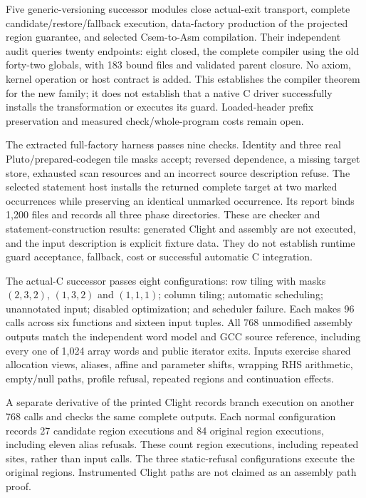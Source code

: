 Five generic-versioning successor modules close actual-exit transport,
complete candidate/restore/fallback execution, data-factory production of the
projected region guarantee, and selected Csem-to-Asm compilation. Their
independent audit queries twenty endpoints: eight closed, the complete compiler
using the old forty-two globals, with 183 bound files and validated parent
closure. No axiom, kernel operation or host contract is added. This establishes
the compiler theorem for the new family; it does not establish that a native
C driver successfully installs the transformation or executes its guard.
Loaded-header prefix preservation and measured check/whole-program costs
remain open.

The extracted full-factory harness passes nine checks. Identity and three real
Pluto/prepared-codegen tile masks accept; reversed dependence, a missing target
store, exhausted scan resources and an incorrect source description refuse.
The selected statement host installs the returned complete target at two marked
occurrences while preserving an identical unmarked occurrence. Its report binds
1,200 files and records all three phase directories. These are checker and
statement-construction results: generated Clight and assembly are not executed,
and the input description is explicit fixture data. They do not establish
runtime guard acceptance, fallback, cost or successful automatic C integration.

The actual-C successor passes eight configurations: row tiling with masks
$(2,3,2)$, $(1,3,2)$ and $(1,1,1)$; column tiling; automatic scheduling;
unannotated input; disabled optimization; and scheduler failure. Each makes
96 calls across six functions and sixteen input tuples. All 768 unmodified
assembly outputs match the independent word model and GCC 
source reference, including every one of 1,024 array words and public iterator
exits. Inputs exercise shared allocation views, aliases, affine and parameter
shifts, wrapping RHS arithmetic, empty/null paths, profile refusal, repeated
regions and continuation effects.

A separate derivative of the printed Clight records branch execution on
another 768 calls and checks the same complete outputs. Each normal
configuration records 27 candidate region executions and 84 original region
executions, including eleven alias refusals. These count region executions,
including repeated sites, rather than input calls. The three static-refusal
configurations execute the original regions. Instrumented Clight paths are
not claimed as an assembly path proof.

